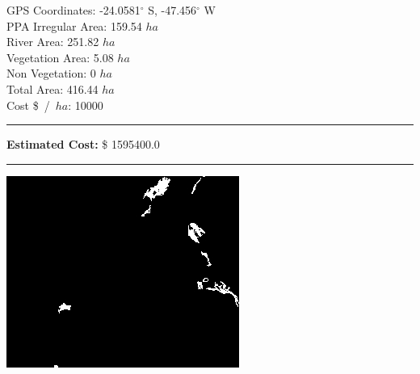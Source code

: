 \documentclass{article}
\begin{document}
    \begin{minipage}{0.5\linewidth}

    GPS Coordinates: -24.0581$^{\circ}$ S, -47.456$^{\circ}$ W    \\
    PPA Irregular Area: 159.54 $ha$  \\
    River Area: 251.82 $ha$              \\
    Vegetation Area: 5.08 $ha$           \\
    Non Vegetation: 0 $ha$           \\
    Total Area: 416.44 $ha$              \\
    Cost \$~/~$ha$: 10000               \\
    \rule{\linewidth}{1pt}
    \textbf{Estimated Cost:} \$ 1595400.0           \\
    \rule{\linewidth}{1pt}

    \end{minipage}\hfil
    \begin{minipage}{0.5\linewidth}
        \includegraphics[width=\linewidth]{mainsettings/temp/map0.jpg}
    \end{minipage}
    
    

    \pagebreak
\end{document}
